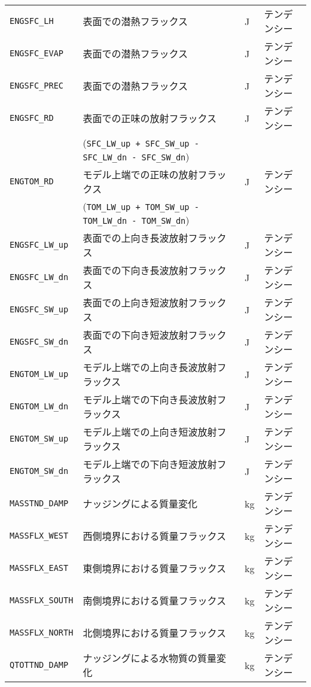 \begin{longtable}{|l|l|l|l|}
      \verb|ENGSFC_LH|    & 表面での潜熱フラックス                & J & テンデンシー \\
      \verb|ENGSFC_EVAP|  & 表面での潜熱フラックス                & J & テンデンシー \\
      \verb|ENGSFC_PREC|  & 表面での潜熱フラックス                & J & テンデンシー \\
      \verb|ENGSFC_RD|    & 表面での正味の放射フラックス           & J & テンデンシー \\
                          & (\verb|SFC_LW_up + SFC_SW_up - SFC_LW_dn - SFC_SW_dn|) & & \\
      \verb|ENGTOM_RD|    & モデル上端での正味の放射フラックス      & J & テンデンシー \\
                          & (\verb|TOM_LW_up + TOM_SW_up - TOM_LW_dn - TOM_SW_dn|) & & \\
      \verb|ENGSFC_LW_up| & 表面での上向き長波放射フラックス      & J & テンデンシー \\
      \verb|ENGSFC_LW_dn| & 表面での下向き長波放射フラックス      & J & テンデンシー \\
      \verb|ENGSFC_SW_up| & 表面での上向き短波放射フラックス      & J & テンデンシー \\
      \verb|ENGSFC_SW_dn| & 表面での下向き短波放射フラックス      & J & テンデンシー \\
      \verb|ENGTOM_LW_up| & モデル上端での上向き長波放射フラックス & J & テンデンシー \\
      \verb|ENGTOM_LW_dn| & モデル上端での下向き長波放射フラックス & J & テンデンシー \\
      \verb|ENGTOM_SW_up| & モデル上端での上向き短波放射フラックス & J & テンデンシー \\
      \verb|ENGTOM_SW_dn| & モデル上端での下向き短波放射フラックス & J & テンデンシー \\
      \verb|MASSTND_DAMP|  & ナッジングによる質量変化                 & kg & テンデンシー \\
      \verb|MASSFLX_WEST|  & 西側境界における質量フラックス           & kg & テンデンシー \\
      \verb|MASSFLX_EAST|  & 東側境界における質量フラックス           & kg & テンデンシー \\
      \verb|MASSFLX_SOUTH| & 南側境界における質量フラックス           & kg & テンデンシー \\
      \verb|MASSFLX_NORTH| & 北側境界における質量フラックス           & kg & テンデンシー \\
      \verb|QTOTTND_DAMP|  & ナッジングによる水物質の質量変化           & kg & テンデンシー \\

\end{longtable}
